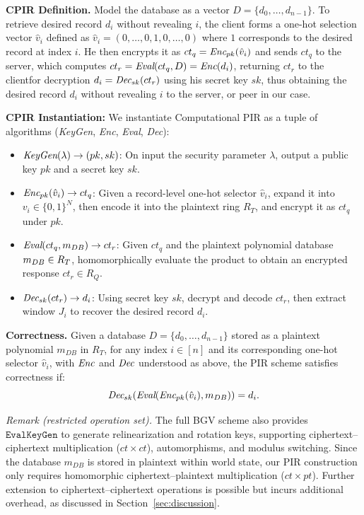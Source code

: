 \documentclass{ieeetj}
\begin{document}
\textbf{CPIR Definition.}
Model the database as a vector $D=\{d_0,\dots,d_{n-1}\}$. To retrieve desired record $d_i$ without revealing $i$, 
the client forms a one-hot selection vector $\hat{v}_i$ defined as $\hat{v}_i= (0,\dots,0,1,0,\dots,0)$ where $1$ 
corresponds to the desired record at index $i$. He then encrypts it as $ct_q = \emph{Enc}_{pk}(\hat{v}_i)$ and sends $ct_q$ to the server,
which computes $ct_r = \emph{Eval}(ct_q, D) = \emph{Enc}(d_i)$, returning $ct_r$ to the clientfor decryption $d_i = \emph{Dec}_{sk}(ct_r)$
using his secret key $sk$, thus obtaining the desired record $d_i$ without revealing $i$ to the server, or peer in our case.

\textbf{CPIR Instantiation:}
We instantiate Computational PIR as a tuple of algorithms (\emph{KeyGen}, 
\emph{Enc}, \emph{Eval}, \emph{Dec}):
\begin{itemize}
    \item $\emph{KeyGen}(\lambda) \rightarrow (pk, sk)$: On input the security parameter $\lambda$, output a public key $pk$ and a secret key $sk$.
    \item $\emph{Enc}_{pk}(\hat{v}_i) \rightarrow ct_q$: Given a record-level one-hot selector $\hat{v}_i$, expand it into $v_i \in \{0,1\}^N$, then
    encode it into the plaintext ring $R_T$, and encrypt it as $ct_q$ under $pk$.
    \item $\emph{Eval}(ct_q, \emph{$m_{DB}$}) \rightarrow ct_r$: Given $ct_q$ and the plaintext polynomial database $\emph{$m_{DB}$} \in R_T$, 
    homomorphically evaluate the product to obtain an encrypted response $ct_r \in R_Q$.
    \item $\emph{Dec}_{sk}(ct_r) \rightarrow d_i$: Using secret key $sk$, decrypt and decode $ct_r$, then extract window $J_i$
    to recover the desired record $d_i$.
\end{itemize}

\noindent \textbf{Correctness.} 
Given a database $D=\{d_0,\dots,d_{n-1}\}$ stored as a plaintext polynomial \emph{$m_{DB}$} in $R_T$, for any index $i \in [n]$
and its corresponding one-hot selector $\hat{v}_i$, with $\emph{Enc}$ and $\emph{Dec}$ understood as above, the PIR scheme satisfies correctness if:
\[
\emph{Dec}_{sk}\!\left(\emph{Eval}\!\left(\emph{Enc}_{pk}(\hat{v}_i), \emph{$m_{DB}$}\right)\right) = d_i.
\]

\noindent \textit{Remark (restricted operation set).} 
The full BGV scheme also provides $\texttt{EvalKeyGen}$ to generate relinearization and rotation keys,
supporting ciphertext–ciphertext multiplication ($ct \times ct$), automorphisms, and modulus switching.
Since the database \emph{$m_{DB}$} is stored in plaintext within world state,
our PIR construction only requires homomorphic ciphertext–plaintext multiplication ($ct \times pt$).
Further extension to ciphertext–ciphertext operations is possible but incurs additional overhead, as discussed in Section~\ref{sec:discussion}.
\end{document}
